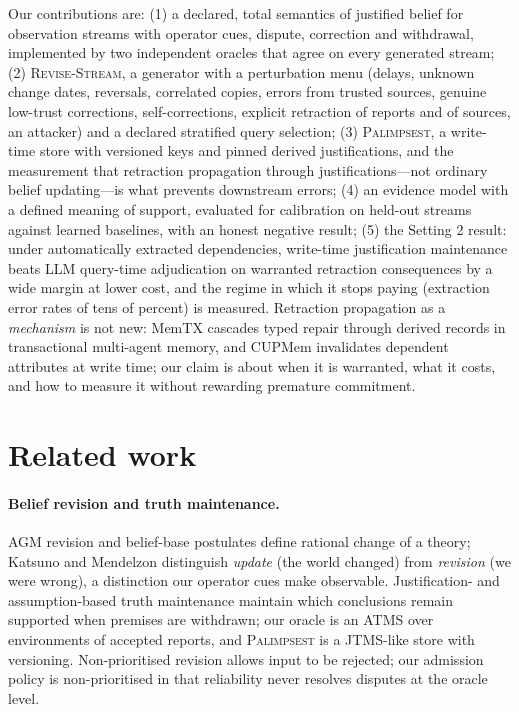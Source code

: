 \documentclass[11pt]{article}
\newcommand{\pal}{\textsc{Palimpsest}}
\newcommand{\rs}{\textsc{Revise-Stream}}
\begin{document}
Our contributions are: (1) a declared, total semantics of justified belief for observation streams with operator cues, dispute, correction and withdrawal, implemented by two independent oracles that agree on every generated stream; (2) \rs, a generator with a perturbation menu (delays, unknown change dates, reversals, correlated copies, errors from trusted sources, genuine low-trust corrections, self-corrections, explicit retraction of reports and of sources, an attacker) and a declared stratified query selection; (3) \pal, a write-time store with versioned keys and pinned derived justifications, and the measurement that retraction propagation through justifications---not ordinary belief updating---is what prevents downstream errors; (4) an evidence model with a defined meaning of support, evaluated for calibration on held-out streams against learned baselines, with an honest negative result; (5) the Setting 2 result: under automatically extracted dependencies, write-time justification maintenance beats LLM query-time adjudication on warranted retraction consequences by a wide margin at lower cost, and the regime in which it stops paying (extraction error rates of tens of percent) is measured. Retraction propagation as a \emph{mechanism} is not new: MemTX \citep{memtx2026} cascades typed repair through derived records in transactional multi-agent memory, and CUPMem \citep{stale2026} invalidates dependent attributes at write time; our claim is about when it is warranted, what it costs, and how to measure it without rewarding premature commitment.

\section{Related work}
\paragraph{Belief revision and truth maintenance.} AGM revision \citep{agm1985} and belief-base postulates \citep{hansson1999} define rational change of a theory; Katsuno and Mendelzon \citep{km1991} distinguish \emph{update} (the world changed) from \emph{revision} (we were wrong), a distinction our operator cues make observable. Justification- and assumption-based truth maintenance \citep{doyle1979,dekleer1986} maintain which conclusions remain supported when premises are withdrawn; our oracle is an ATMS over environments of accepted reports, and \pal{} is a JTMS-like store with versioning. Non-prioritised revision \citep{hansson1997,makinson1997} allows input to be rejected; our admission policy is non-prioritised in that reliability never resolves disputes at the oracle level.
\end{document}
